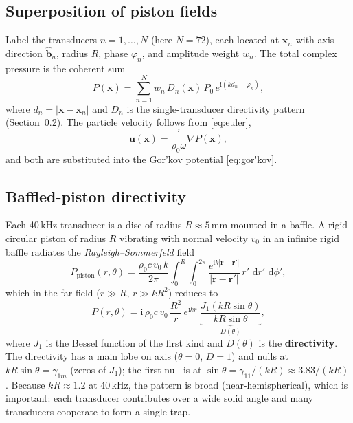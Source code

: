 \documentclass[11pt]{article}
\newcommand{\rrho}{\rho_{0}}
\newcommand{\dd}{\,\mathrm{d}}
\newcommand{\ii}{\mathrm{i}}
\newcommand{\uu}{\mathbf{u}}
\newcommand{\xx}{\mathbf{x}}
\newcommand{\rr}{\mathbf{r}}
\newcommand{\bb}{\mathbf{b}}
\begin{document}
\subsection{Superposition of piston fields}

Label the transducers $n=1,\dots,N$ (here $N=72$), each located at $\xx_{n}$
with axis direction $\hat{\bb}_{n}$, radius $R$, phase $\varphi_{n}$, and
amplitude weight $w_{n}$. The total complex pressure is the coherent sum
\begin{equation}
  P(\xx)=\sum_{n=1}^{N} w_{n}\,D_{n}(\xx)\,P_{0}\,e^{\ii(k d_{n}+\varphi_{n})},
  \label{eq:superposition}
\end{equation}
where $d_{n}=|\xx-\xx_{n}|$ and $D_{n}$ is the single-transducer directivity
pattern (Section~\ref{sec:piston}). The particle velocity follows from
\eqref{eq:euler},
\begin{equation}
  \uu(\xx)=\frac{\ii}{\rrho\omega}\nabla P(\xx),
\end{equation}
and both are substituted into the Gor'kov potential \eqref{eq:gor'kov}.

\subsection{Baffled-piston directivity}
\label{sec:piston}

Each 40\,kHz transducer is a disc of radius $R\approx5\,\mathrm{mm}$ mounted in a
baffle. A rigid circular piston of radius $R$ vibrating with normal velocity
$v_{0}$ in an infinite rigid baffle radiates the \emph{Rayleigh--Sommerfeld}
field
\begin{equation}
  P_{\mathrm{piston}}(r,\theta)=
  \frac{\rrho c\,v_{0}\,k}{2\pi}\int_{0}^{R}\!\int_{0}^{2\pi}
  \frac{e^{\ii k|\rr-\rr'|}}{|\rr-\rr'|}\,r'\,\dd r'\,\dd\phi',
  \label{eq:rayleigh}
\end{equation}
which in the far field ($r\gg R$, $r\gg kR^{2}$) reduces to
\begin{equation}
  P(r,\theta)=\ii\,\rrho c\,v_{0}\,\frac{R^{2}}{r}\,
    e^{\ii kr}\;
    \underbrace{\frac{J_{1}(kR\sin\theta)}{kR\sin\theta}}_{D(\theta)},
  \label{eq:pistonfar}
\end{equation}
where $J_{1}$ is the Bessel function of the first kind and $D(\theta)$ is the
\textbf{directivity}. The directivity has a main lobe on axis ($\theta=0$,
$D=1$) and nulls at $kR\sin\theta=\gamma_{1m}$ (zeros of $J_{1}$); the first
null is at $\sin\theta=\gamma_{11}/(kR)\approx3.83/(kR)$. Because $kR\approx1.2$
at 40\,kHz, the pattern is broad (near-hemispherical), which is important: each
transducer contributes over a wide solid angle and many transducers cooperate to
form a single trap.
\end{document}
